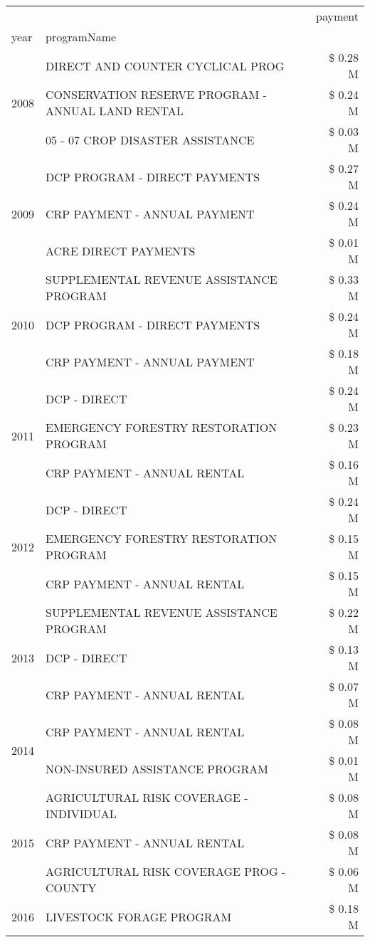 \begin{tabular}{llr}
\toprule
 &  & payment \\
year & programName &  \\
\midrule
\multirow[t]{3}{*}{2008} & DIRECT AND COUNTER CYCLICAL PROG & \$ 0.28 M \\
 & CONSERVATION RESERVE PROGRAM - ANNUAL LAND RENTAL & \$ 0.24 M \\
 & 05 - 07 CROP DISASTER ASSISTANCE & \$ 0.03 M \\
\cline{1-3}
\multirow[t]{3}{*}{2009} & DCP PROGRAM - DIRECT PAYMENTS & \$ 0.27 M \\
 & CRP PAYMENT - ANNUAL PAYMENT & \$ 0.24 M \\
 & ACRE DIRECT PAYMENTS & \$ 0.01 M \\
\cline{1-3}
\multirow[t]{3}{*}{2010} & SUPPLEMENTAL REVENUE ASSISTANCE PROGRAM & \$ 0.33 M \\
 & DCP PROGRAM - DIRECT PAYMENTS & \$ 0.24 M \\
 & CRP PAYMENT - ANNUAL PAYMENT & \$ 0.18 M \\
\cline{1-3}
\multirow[t]{3}{*}{2011} & DCP - DIRECT & \$ 0.24 M \\
 & EMERGENCY FORESTRY RESTORATION PROGRAM & \$ 0.23 M \\
 & CRP PAYMENT - ANNUAL RENTAL & \$ 0.16 M \\
\cline{1-3}
\multirow[t]{3}{*}{2012} & DCP - DIRECT & \$ 0.24 M \\
 & EMERGENCY FORESTRY RESTORATION PROGRAM & \$ 0.15 M \\
 & CRP PAYMENT - ANNUAL RENTAL & \$ 0.15 M \\
\cline{1-3}
\multirow[t]{3}{*}{2013} & SUPPLEMENTAL REVENUE ASSISTANCE PROGRAM & \$ 0.22 M \\
 & DCP - DIRECT & \$ 0.13 M \\
 & CRP PAYMENT - ANNUAL RENTAL & \$ 0.07 M \\
\cline{1-3}
\multirow[t]{2}{*}{2014} & CRP PAYMENT - ANNUAL RENTAL & \$ 0.08 M \\
 & NON-INSURED ASSISTANCE PROGRAM & \$ 0.01 M \\
\cline{1-3}
\multirow[t]{3}{*}{2015} & AGRICULTURAL RISK COVERAGE - INDIVIDUAL & \$ 0.08 M \\
 & CRP PAYMENT - ANNUAL RENTAL & \$ 0.08 M \\
 & AGRICULTURAL RISK COVERAGE PROG - COUNTY & \$ 0.06 M \\
\cline{1-3}
\multirow[t]{3}{*}{2016} & LIVESTOCK FORAGE PROGRAM                      & \$ 0.18 M \\

\end{tabular}
